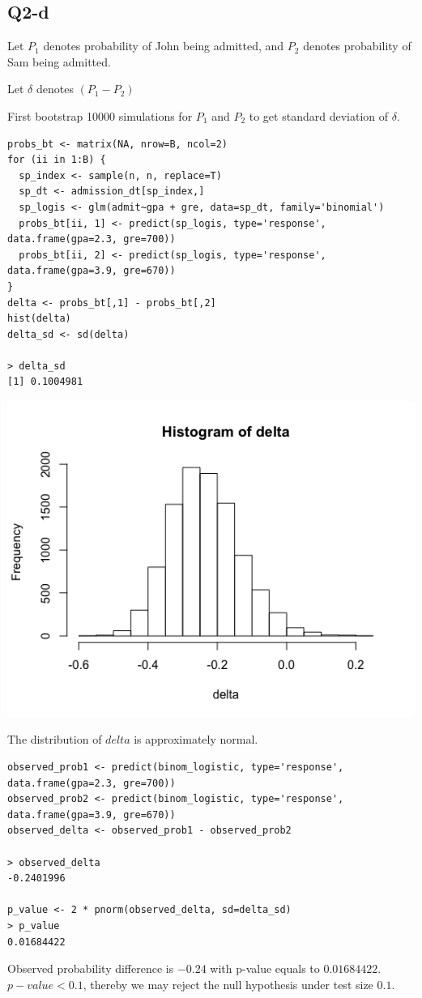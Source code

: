 \documentclass[12pt,letterpaper]{article}
\begin{document}
\newpage
\subsection*{Q2-d}
\noindent Let $P_1$ denotes probability of John being admitted, and $P_2$ denotes probability of Sam being admitted. 

\noindent Let $\delta$ denotes $(P_1 - P_2)$

\noindent First bootstrap 10000 simulations for $P_1$ and $P_2$ to get standard deviation of $\delta$.
\begin{verbatim}
probs_bt <- matrix(NA, nrow=B, ncol=2)
for (ii in 1:B) {
  sp_index <- sample(n, n, replace=T)
  sp_dt <- admission_dt[sp_index,]
  sp_logis <- glm(admit~gpa + gre, data=sp_dt, family='binomial')
  probs_bt[ii, 1] <- predict(sp_logis, type='response', data.frame(gpa=2.3, gre=700))
  probs_bt[ii, 2] <- predict(sp_logis, type='response', data.frame(gpa=3.9, gre=670))
}
delta <- probs_bt[,1] - probs_bt[,2]
hist(delta)
delta_sd <- sd(delta)

> delta_sd
[1] 0.1004981
\end{verbatim}

\includegraphics[scale=0.7]{q2-d.png}

\noindent The distribution of $delta$ is approximately normal.  \\

\begin{verbatim}
observed_prob1 <- predict(binom_logistic, type='response', data.frame(gpa=2.3, gre=700))
observed_prob2 <- predict(binom_logistic, type='response', data.frame(gpa=3.9, gre=670))
observed_delta <- observed_prob1 - observed_prob2

> observed_delta
-0.2401996 

p_value <- 2 * pnorm(observed_delta, sd=delta_sd)
> p_value
0.01684422 

\end{verbatim}

\noindent Observed probability difference is $-0.24$ with p-value equals to $0.01684422$. \\

\noindent $p-value < 0.1$, thereby we may reject the null hypothesis under test size $0.1$.



\end{document}
